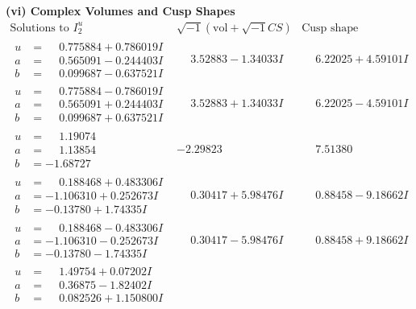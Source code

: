 \documentclass[1p]{elsarticle_modified}
\theoremstyle{definition}
\newcommand{\I}{\sqrt{-1}}
\begin{document}
\newpage\flushleft \textbf{(vi) Complex Volumes and Cusp Shapes}
$$\begin{array}{c|c|c}  
\text{Solutions to }I^u_{2}& \I (\text{vol} + \sqrt{-1}CS) & \text{Cusp shape}\\
 \hline 
\begin{aligned}
u &= \phantom{-}0.775884 + 0.786019 I \\
a &= \phantom{-}0.565091 - 0.244403 I \\
b &= \phantom{-}0.099687 - 0.637521 I\end{aligned}
 & \phantom{-}3.52883 - 1.34033 I & \phantom{-}6.22025 + 4.59101 I \\ \hline\begin{aligned}
u &= \phantom{-}0.775884 - 0.786019 I \\
a &= \phantom{-}0.565091 + 0.244403 I \\
b &= \phantom{-}0.099687 + 0.637521 I\end{aligned}
 & \phantom{-}3.52883 + 1.34033 I & \phantom{-}6.22025 - 4.59101 I \\ \hline\begin{aligned}
u &= \phantom{-}1.19074\phantom{ +0.000000I} \\
a &= \phantom{-}1.13854\phantom{ +0.000000I} \\
b &= -1.68727\phantom{ +0.000000I}\end{aligned}
 & -2.29823\phantom{ +0.000000I} & \phantom{-}7.51380\phantom{ +0.000000I} \\ \hline\begin{aligned}
u &= \phantom{-}0.188468 + 0.483306 I \\
a &= -1.106310 + 0.252673 I \\
b &= -0.13780 + 1.74335 I\end{aligned}
 & \phantom{-}0.30417 + 5.98476 I & \phantom{-}0.88458 - 9.18662 I \\ \hline\begin{aligned}
u &= \phantom{-}0.188468 - 0.483306 I \\
a &= -1.106310 - 0.252673 I \\
b &= -0.13780 - 1.74335 I\end{aligned}
 & \phantom{-}0.30417 - 5.98476 I & \phantom{-}0.88458 + 9.18662 I \\ \hline\begin{aligned}
u &= \phantom{-}1.49754 + 0.07202 I \\
a &= \phantom{-}0.36875 - 1.82402 I \\
b &= \phantom{-}0.082526 + 1.150800 I\end{aligned}

\end{array}$$
\end{document}
